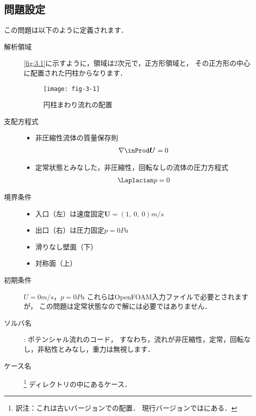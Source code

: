 \subsection{問題設定}
\label{ssec:3.1.1}
この問題は以下のように定義されます．
\begin{description}
 \item[解析領域] \autoref{fig:3.1}に示すように，領域は2次元で，正方形領域と，
            その正方形の中心に配置された円柱からなります．


\begin{figure}[ht]
 \texttt{[image: fig-3-1]}
 \caption{円柱まわり流れの配置}
 \label{fig:3.1}
\end{figure}


 \item[支配方程式] \mbox{}
            \begin{itemize}
             \item 非圧縮性流体の質量保存則
                   \begin{align}
                    \label{eq:3.1}
                    \nabla \inProd \bm{U} = 0
                   \end{align}
             \item 定常状態とみなした，非圧縮性，回転なしの流体の圧力方程式
                   \begin{align}
                    \label{eq:3.2}
                    \Laplacian p = 0
                   \end{align}
            \end{itemize}
 \item[境界条件] \mbox{}
            \begin{itemize}
             \item 入口（左）は速度固定$\bm{U} = (1,\ 0,\ 0) \unit{m/s}$
             \item 出口（右）は圧力固定$p = 0 \unit{Pa}$
             \item 滑りなし壁面（下）
             \item 対称面（上）
            \end{itemize}
 \item[初期条件] $U = 0 \unit{m/s}$，$p = 0 \unit{Pa}$\jdash
            これらはOpenFOAM入力ファイルで必要とされますが，
            この問題は定常状態なので解には必要ではありません．
 \item[ソルバ名] : ポテンシャル流れのコード，
            すなわち，流れが非圧縮性，定常，回転なし，非粘性とみなし，重力は無視します．
 \item[ケース名] %
\footnote{訳注：これは古いバージョンでの配置．
現行バージョンではにある．}%
            ディレクトリの中にあるケース．
\end{description}


